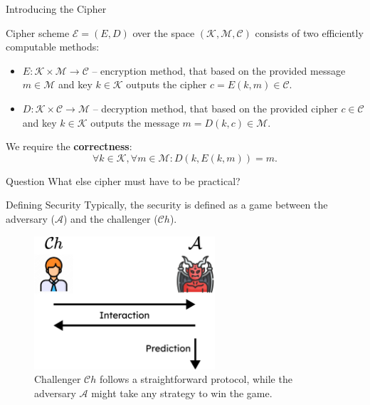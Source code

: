 \documentclass{beamer}
\begin{document}
    \begin{frame}{Introducing the Cipher}
        \begin{definition}
            Cipher scheme $\mathcal{E} = (E,D)$ over the space $(\mathcal{K}, \mathcal{M}, \mathcal{C})$ consists of two efficiently computable methods:
            \begin{itemize}
                \item $E: \mathcal{K} \times \mathcal{M} \to \mathcal{C}$ -- encryption method, that based on the provided message $m \in \mathcal{M}$ and key $k \in \mathcal{K}$ outputs the cipher $c = E(k,m) \in \mathcal{C}$.\pause
                \item $D: \mathcal{K} \times \mathcal{C} \to \mathcal{M}$ -- decryption method, that based on the provided cipher $c \in \mathcal{C}$ and key $k \in \mathcal{K}$ outputs the message $m = D(k,c) \in \mathcal{M}$.\pause
            \end{itemize}
        \end{definition}

        We require the \textbf{correctness}:
        \begin{equation*}
            \forall k \in \mathcal{K}, \forall m \in \mathcal{M}: D(k,E(k,m)) = m.
        \end{equation*}

        \pause\begin{alertblock}{Question}
            What else cipher must have to be practical?
        \end{alertblock}
    \end{frame}

    \begin{frame}{Defining Security}
        Typically, the security is defined as a game between the adversary ($\mathcal{A}$) and the challenger ($\mathcal{C}h$).

        \begin{figure}
            \includegraphics[width=0.6\textwidth]{images/lecture_2/interaction.pdf}
            \caption{Challenger $\mathcal{C}h$ follows a straightforward protocol, while the adversary $\mathcal{A}$ might take any strategy to win the game.}
            \label{fig:wuuttt}
        \end{figure}
    \end{frame}
\end{document}
